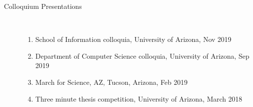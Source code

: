 \documentclass[10pt]{article}
\begin{document}
\begin{description}
\item [Colloquium Presentations]\

\begin{enumerate}

\item School of Information colloquia, University of Arizona, Nov 2019
\item Department of Computer Science colloquia, University of Arizona, Sep 2019
\item March for Science, AZ, Tucson, Arizona, Feb 2019
\item Three minute thesis competition, University of Arizona, March 2018

\end{enumerate}



\end{description}
\end{document}
